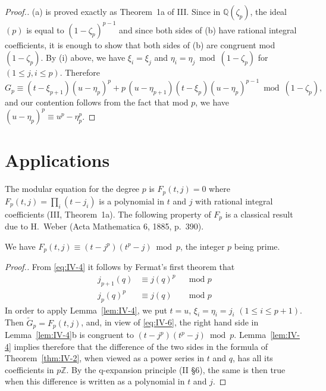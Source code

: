 \begin{proof}[Proof.]
(a) is proved exactly as Theorem~1a of III. Since in
$\mathbb{Q}(\zeta_{p})$, the ideal $(p)$ is equal to
$(1-\zeta_{p})^{p-1}$ and since both sides of (b) have rational integral
coefficients, it is enough to show that both sides of (b) are congruent
mod $(1-\zeta_{p})$. By (i) above, we have $\xi_{i}=\xi_{j}$ and
$\eta_{i}=\eta_{j}\bmod(1-\zeta_{p})$ for $(1\leq j,i\leq p)$. Therefore
\[
G_{p}\equiv(t-\xi_{p+1})(u-\eta_{p})^{p}
+p\,(u-\eta_{p+1})(t-\xi_{p})(u-\eta_{p})^{p-1}\bmod(1-\zeta_{p}),
\]
and our contention follows from the fact that mod $p$, we have
$(u-\eta_{p})^{p}\equiv u^{p}-\eta_{p}^{p}$.
\end{proof}

\section{Applications}\label{sec:IV-applications}

The modular equation for the degree $p$ is $F_{p}(t,j)=0$ where
$F_{p}(t,j)=\prod_{i}(t-j_{i})$ is a polynomial in $t$ and $j$ with
rational integral coefficients (III, Theorem~1a). The following property
of $F_{p}$ is a classical result due to H.~Weber (Acta Mathematica 6,
1885, p.~390).

\begin{theorem}\label{thm:IV-2}
We have $F_{p}(t,j)\equiv(t-j^{p})(t^{p}-j)\bmod p$, the integer $p$
being prime.
\end{theorem}

\begin{proof}[Proof.]
From \eqref{eq:IV-4} it follows by Fermat's first theorem that
\[
\begin{aligned}
j_{p+1}(q)&\equiv j(q)^{p} &&\text{mod }p\\
j_{p}(q)^{p}&\equiv j(q) &&\text{mod }p
\end{aligned}
\tag{6}\label{eq:IV-6}
\]
In order to apply Lemma~\ref{lem:IV-4}, we put $t=u$,
$\xi_{i}=\eta_{i}=j_{i}$ $(1\leq i\leq p+1)$. Then
$\widetilde{G}_{p}=F_{p}(t,j)$, and, in view of \eqref{eq:IV-6}, the right
hand side in Lemma~\ref{lem:IV-4}b is congruent to
$(t-j^{p})(t^{p}-j)\bmod p$. Lemma~\ref{lem:IV-4} implies therefore that
the difference of the two sides in the formula of
Theorem~\ref{thm:IV-2}, when viewed as a power series in $t$ and $q$, has
all its coefficients in $p\mathbb{Z}$. By the q-expansion principle
(II §6), the same is then true when this difference is written as a
polynomial in $t$ and $j$.
\end{proof}

